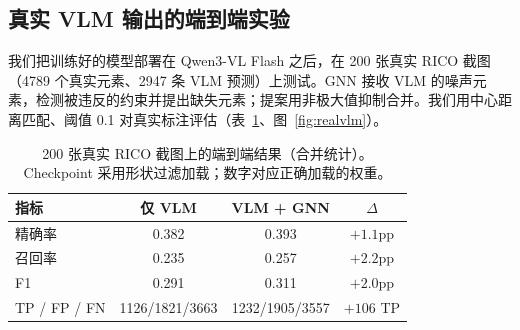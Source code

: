 \documentclass[11pt, letterpaper]{ctexart}
\begin{document}
\subsection{真实 VLM 输出的端到端实验}\label{sec:endtoend}
我们把训练好的模型部署在 Qwen3-VL Flash 之后，在 200 张真实 RICO 截图（4789 个真实元素、2947 条 VLM 预测）上测试。GNN 接收 VLM 的噪声元素，检测被违反的约束并提出缺失元素；提案用非极大值抑制合并。我们用中心距离匹配、阈值 0.1 对真实标注评估（表~\ref{tab:real}、图~\ref{fig:realvlm}）。

\begin{table}[htbp]
\caption{200 张真实 RICO 截图上的端到端结果（合并统计）。Checkpoint 采用形状过滤加载；数字对应正确加载的权重。}
\label{tab:real}
\centering
\begin{tabularx}{\textwidth}{Xccc}
\toprule
\textbf{指标} & \textbf{仅 VLM} & \textbf{VLM + GNN} & \textbf{$\Delta$} \\
\midrule
精确率 & 0.382 & 0.393 & $+1.1$pp \\
召回率 & 0.235 & 0.257 & $+2.2$pp \\
F1 & 0.291 & 0.311 & $+2.0$pp \\
TP / FP / FN & 1126/1821/3663 & 1232/1905/3557 & $+106$ TP \\
\bottomrule
\end{tabularx}
\end{table}
\end{document}
